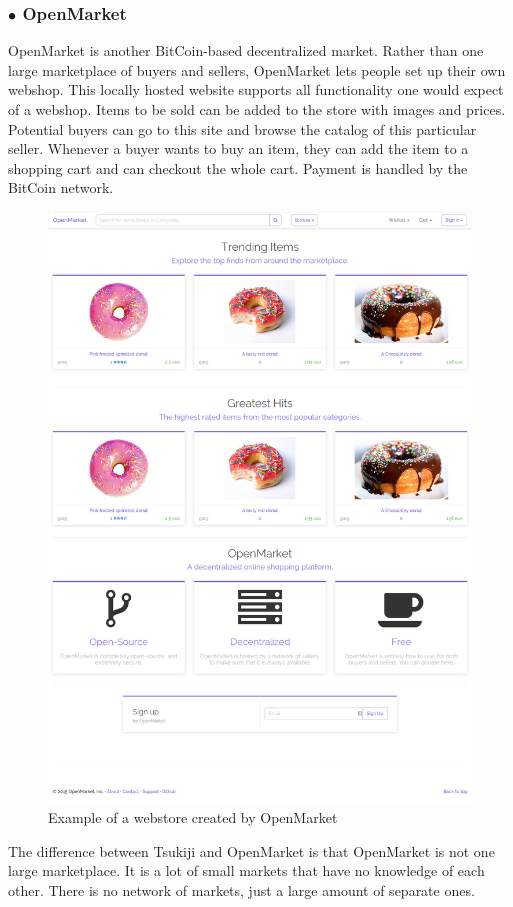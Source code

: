 \subsubsection*{$\bullet$ OpenMarket}
OpenMarket \cite{openmarket} is another BitCoin-based decentralized market.
Rather than one large marketplace of buyers and sellers, OpenMarket lets people set up their own webshop.
This locally hosted website supports all functionality one would expect of a webshop.
Items to be sold can be added to the store with images and prices. 
Potential buyers can go to this site and browse the catalog of this particular seller.
Whenever a buyer wants to buy an item, they can add the item to a shopping cart and can checkout the whole cart.
Payment is handled by the BitCoin network.
\begin{figure}[H]
  \centering
  \includegraphics[scale=0.2]{openmarket}
  \caption{Example of a webstore created by OpenMarket\cite{opemarketpic}}
  \label{openmarketfig}
\end{figure}
The difference between Tsukiji and OpenMarket is that OpenMarket is not one large marketplace.
It is a lot of small markets that have no knowledge of each other.
There is no network of markets, just a large amount of separate ones.

